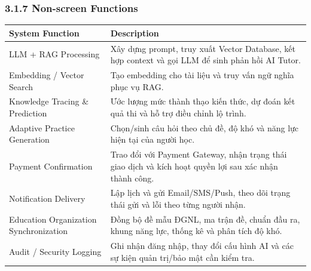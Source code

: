 \documentclass[12pt,a4paper,oneside]{report}
\begin{document}
\subsubsection*{3.1.7 Non-screen Functions}
\begin{longtable}{|p{4.2cm}|p{9.2cm}|}
\hline
\rowcolor{orange!15}\textbf{System Function} & \textbf{Description} \\
\hline
LLM + RAG Processing & Xây dựng prompt, truy xuất Vector Database, kết hợp context và gọi LLM để sinh phản hồi AI Tutor. \\
\hline
Embedding / Vector Search & Tạo embedding cho tài liệu và truy vấn ngữ nghĩa phục vụ RAG. \\
\hline
Knowledge Tracing \& Prediction & Ước lượng mức thành thạo kiến thức, dự đoán kết quả thi và hỗ trợ điều chỉnh lộ trình. \\
\hline
Adaptive Practice Generation & Chọn/sinh câu hỏi theo chủ đề, độ khó và năng lực hiện tại của người học. \\
\hline
Payment Confirmation & Trao đổi với Payment Gateway, nhận trạng thái giao dịch và kích hoạt quyền lợi sau xác nhận thành công. \\
\hline
Notification Delivery & Lập lịch và gửi Email/SMS/Push, theo dõi trạng thái gửi và lỗi theo từng người nhận. \\
\hline
Education Organization Synchronization & Đồng bộ đề mẫu ĐGNL, ma trận đề, chuẩn đầu ra, khung năng lực, thống kê và phân tích độ khó. \\
\hline
Audit / Security Logging & Ghi nhận đăng nhập, thay đổi cấu hình AI và các sự kiện quản trị/bảo mật cần kiểm tra. \\
\hline
\end{longtable}


\setcounter{chapter}{3}
\setcounter{section}{1}
\setcounter{subsection}{0}
\setcounter{subsubsection}{0}
\end{document}

